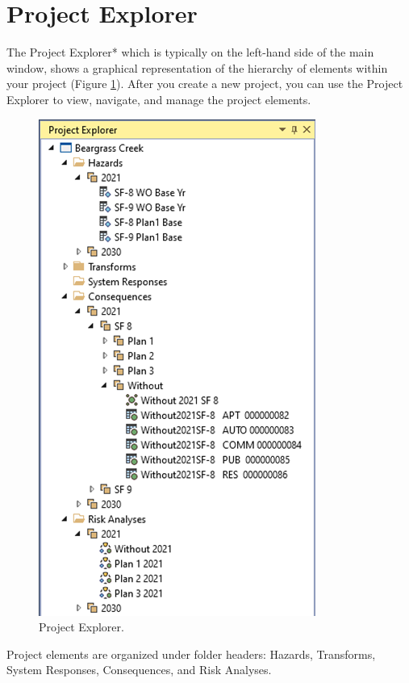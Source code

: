 \documentclass[
]{book}
\begin{document}
\hypertarget{project-explorer}{%
\section{Project Explorer}\label{project-explorer}}

The Project Explorer* which is typically on the left-hand side of the main window, shows a graphical representation of the hierarchy of elements within your project (Figure \ref{fig:figure-24}). After you create a new project, you can use the Project Explorer to view, navigate, and manage the project elements.

\begin{figure}

{\centering \includegraphics{images/figure24} 

}

\caption{Project Explorer.}\label{fig:figure-24}
\end{figure}

Project elements are organized under folder headers: Hazards, Transforms, System Responses, Consequences, and Risk Analyses.
\end{document}
